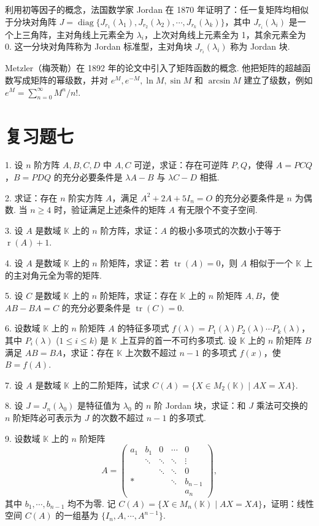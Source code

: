 \documentclass[UTF8, 12pt, fontset=fandol, oneside]{ctexart}
\begin{document}
利用初等因子的概念，法国数学家 Jordan 在 1870 年证明了：任一复矩阵均相似于分块对角阵 $J=\operatorname{diag}\{J_{r_1}(\lambda_1),J_{r_2}(\lambda_2),\cdots,J_{r_k}(\lambda_k)\}$，其中 $J_{r_i}(\lambda_i)$ 是一个上三角阵，主对角线上元素全为 $\lambda_i$，上次对角线上元素全为 1，其余元素全为 0. 这一分块对角阵称为 Jordan 标准型，主对角块 $J_{r_i}(\lambda_i)$ 称为 Jordan 块.

Metzler（梅茨勒）在 1892 年的论文中引入了矩阵函数的概念. 他把矩阵的超越函数写成矩阵的幂级数，并对 $e^M,e^{-M},\ln M,\sin M$ 和 $\arcsin M$ 建立了级数，例如 $e^M=\sum_{n=0}^{\infty}M^n/n!$.

\section*{复习题七}

1. 设 $n$ 阶方阵 $A,B,C,D$ 中 $A,C$ 可逆，求证：存在可逆阵 $P,Q$，使得 $A=PCQ$，$B=PDQ$ 的充分必要条件是 $\lambda A-B$ 与 $\lambda C-D$ 相抵.

2. 求证：存在 $n$ 阶实方阵 $A$，满足 $A^2+2A+5I_n=O$ 的充分必要条件是 $n$ 为偶数. 当 $n\geq 4$ 时，验证满足上述条件的矩阵 $A$ 有无限个不变子空间.

3. 设 $A$ 是数域 $\mathbb K$ 上的 $n$ 阶方阵，求证：$A$ 的极小多项式的次数小于等于 $\operatorname{r}(A)+1$.

4. 设 $A$ 是数域 $\mathbb K$ 上的 $n$ 阶矩阵，求证：若 $\operatorname{tr}(A)=0$，则 $A$ 相似于一个 $\mathbb K$ 上的主对角元全为零的矩阵.

5. 设 $C$ 是数域 $\mathbb K$ 上的 $n$ 阶矩阵，求证：存在 $\mathbb K$ 上的 $n$ 阶矩阵 $A,B$，使 $AB-BA=C$ 的充分必要条件是 $\operatorname{tr}(C)=0$.

6. 设数域 $\mathbb K$ 上的 $n$ 阶矩阵 $A$ 的特征多项式 $f(\lambda)=P_1(\lambda)P_2(\lambda)\cdots P_k(\lambda)$，其中 $P_i(\lambda)$ ($1\leq i\leq k$) 是 $\mathbb K$ 上互异的首一不可约多项式. 设 $\mathbb K$ 上的 $n$ 阶矩阵 $B$ 满足 $AB=BA$，求证：存在 $\mathbb K$ 上次数不超过 $n-1$ 的多项式 $f(x)$，使 $B=f(A)$.

7. 设 $A$ 是数域 $\mathbb K$ 上的二阶矩阵，试求 $C(A)=\{X\in M_2(\mathbb K)\mid AX=XA\}$.

8. 设 $J=J_n(\lambda_0)$ 是特征值为 $\lambda_0$ 的 $n$ 阶 Jordan 块，求证：和 $J$ 乘法可交换的 $n$ 阶矩阵必可表示为 $J$ 的次数不超过 $n-1$ 的多项式.

9. 设数域 $\mathbb K$ 上的 $n$ 阶矩阵
\[
A=\left(\begin{array}{ccccc}
a_1 & b_1 & 0 & \cdots & 0\\
& \ddots & \ddots & \ddots & \vdots\\
& & \ddots & \ddots & 0\\
* & & & \ddots & b_{n-1}\\
& & & & a_n
\end{array}\right),
\]
其中 $b_1,\cdots,b_{n-1}$ 均不为零. 记 $C(A)=\{X\in M_n(\mathbb K)\mid AX=XA\}$，证明：线性空间 $C(A)$ 的一组基为 $\{I_n,A,\cdots,A^{n-1}\}$.
\end{document}
